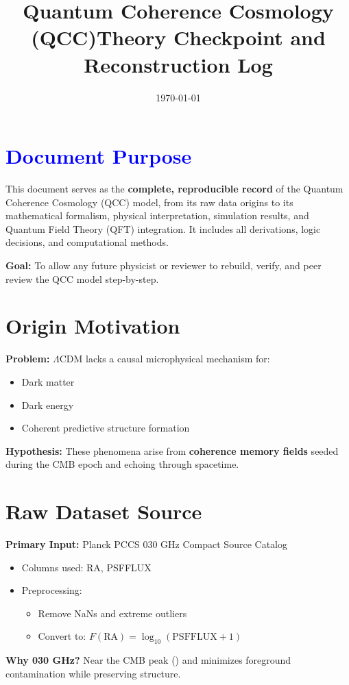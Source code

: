 \documentclass[12pt]{article}
\title{Quantum Coherence Cosmology (QCC)\Full Theory Checkpoint and Reconstruction Log}
\date{\today}
\begin{document}
	\maketitle
	
	\section*{\textcolor{blue}{Document Purpose}}
	This document serves as the \textbf{complete, reproducible record} of the Quantum Coherence Cosmology (QCC) model, from its raw data origins to its mathematical formalism, physical interpretation, simulation results, and Quantum Field Theory (QFT) integration. It includes all derivations, logic decisions, and computational methods.
	
	\textbf{Goal:} To allow any future physicist or reviewer to rebuild, verify, and peer review the QCC model step-by-step.
	
	\section{Origin Motivation}
	\textbf{Problem:} $\Lambda$CDM lacks a causal microphysical mechanism for:
	\begin{itemize}
		\item Dark matter
		\item Dark energy
		\item Coherent predictive structure formation
	\end{itemize}
	\textbf{Hypothesis:} These phenomena arise from \textbf{coherence memory fields} seeded during the CMB epoch and echoing through spacetime.
	
	\section{Raw Dataset Source}
	\textbf{Primary Input:} Planck PCCS 030 GHz Compact Source Catalog
	\begin{itemize}
		\item Columns used: RA, PSFFLUX
		\item Preprocessing:
		\begin{itemize}
			\item Remove NaNs and extreme outliers
			\item Convert to: $F(\text{RA}) = \log_{10}(\text{PSFFLUX} + 1)$
		\end{itemize}
	\end{itemize}
	\textbf{Why 030 GHz?} Near the CMB peak () and minimizes foreground contamination while preserving structure.
	
\end{document}

